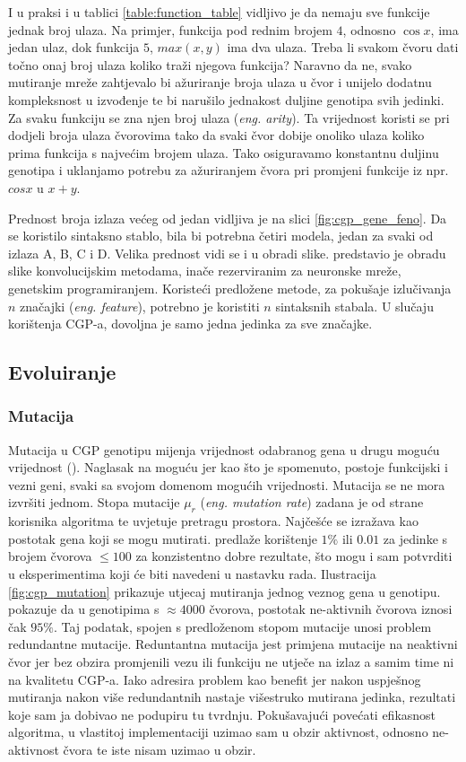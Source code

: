I u praksi i u tablici \ref{table:function_table} vidljivo je da nemaju sve funkcije jednak broj ulaza.
Na primjer, funkcija pod rednim brojem $4$, odnosno $\cos{x}$, ima jedan ulaz, dok funkcija $5$, $max(x, y)$ ima dva ulaza.
Treba li svakom čvoru dati točno onaj broj ulaza koliko traži njegova funkcija?
Naravno da ne, svako mutiranje mreže zahtjevalo bi ažuriranje broja ulaza u čvor i unijelo dodatnu kompleksnost u izvođenje te bi narušilo jednakost duljine genotipa svih jedinki.
Za svaku funkciju se zna njen broj ulaza (\emph{eng. arity}).
Ta vrijednost koristi se pri dodjeli broja ulaza čvorovima tako da svaki čvor dobije onoliko ulaza koliko prima funkcija s najvećim brojem ulaza.
Tako osiguravamo konstantnu duljinu genotipa i uklanjamo potrebu za ažuriranjem čvora pri promjeni funkcije iz npr. $cos{x}$ u $x + y$.

Prednost broja izlaza većeg od jedan vidljiva je na slici \ref{fig:cgp_gene_feno}.
Da se koristilo sintaksno stablo, bila bi potrebna četiri modela, jedan za svaki od izlaza A, B, C i D.
Velika prednost vidi se i u obradi slike.
\cite{conv_gp} predstavio je obradu slike konvolucijskim metodama, inače rezerviranim za neuronske mreže, genetskim programiranjem.
Koristeći predložene metode, za pokušaje izlučivanja $n$ značajki (\emph{eng. feature}), potrebno je koristiti $n$ sintaksnih stabala.
U slučaju korištenja CGP-a, dovoljna je samo jedna jedinka za sve značajke.

\subsection{Evoluiranje}

\subsubsection{Mutacija}
Mutacija u CGP genotipu mijenja vrijednost odabranog gena u drugu moguću vrijednost (\cite{cgp}).
Naglasak na moguću jer kao što je spomenuto, postoje funkcijski i vezni geni, svaki sa svojom domenom mogućih vrijednosti.
Mutacija se ne mora izvršiti jednom.
Stopa mutacije $\mu_r$ (\emph{eng. mutation rate}) zadana je od strane korisnika algoritma te uvjetuje pretragu prostora.
Najčešće se izražava kao postotak gena koji se mogu mutirati.
\cite{cgp} predlaže korištenje $1\%$ ili $0.01$ za jedinke s brojem čvorova $\leq 100$ za konzistentno dobre rezultate, što mogu i sam potvrditi u eksperimentima koji će biti navedeni u nastavku rada.
Ilustracija \ref{fig:cgp_mutation} prikazuje utjecaj mutiranja jednog veznog gena u genotipu.
\cite{cgp_experiment} pokazuje da u genotipima s $\approx 4000$ čvorova, postotak ne-aktivnih čvorova iznosi čak $95\%$.
Taj podatak, spojen s predloženom stopom mutacije unosi problem redundantne mutacije.
Reduntantna mutacija jest primjena mutacije na neaktivni čvor jer bez obzira promjenili vezu ili funkciju ne utječe na izlaz a samim time ni na kvalitetu CGP-a.
Iako \cite{cgp} adresira problem kao benefit jer nakon uspješnog mutiranja nakon više redundantnih nastaje višestruko mutirana jedinka, rezultati koje sam ja dobivao ne podupiru tu tvrdnju.
Pokušavajući povećati efikasnost algoritma, u vlastitoj implementaciji uzimao sam u obzir aktivnost, odnosno ne-aktivnost čvora te iste nisam uzimao u obzir.

